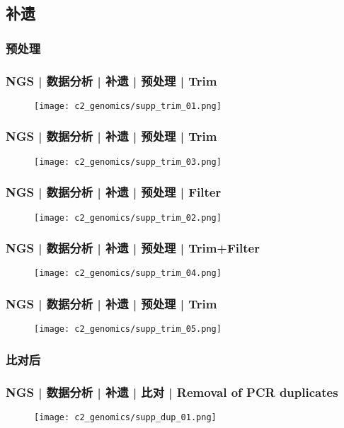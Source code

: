 \subsection{补遗}
\subsubsection{预处理}
\begin{frame}
  \frametitle{NGS | 数据分析 | 补遗 | 预处理 | Trim}
  \begin{figure}
    \centering
    \texttt{[image: c2\_genomics/supp\_trim\_01.png]}
  \end{figure}
\end{frame}

\begin{frame}
  \frametitle{NGS | 数据分析 | 补遗 | 预处理 | Trim}
  \begin{figure}
    \centering
    \texttt{[image: c2\_genomics/supp\_trim\_03.png]}
  \end{figure}
\end{frame}

\begin{frame}
  \frametitle{NGS | 数据分析 | 补遗 | 预处理 | Filter}
  \begin{figure}
    \centering
    \texttt{[image: c2\_genomics/supp\_trim\_02.png]}
  \end{figure}
\end{frame}

\begin{frame}
  \frametitle{NGS | 数据分析 | 补遗 | 预处理 | Trim+Filter}
  \begin{figure}
    \centering
    \texttt{[image: c2\_genomics/supp\_trim\_04.png]}
  \end{figure}
\end{frame}

\begin{frame}
  \frametitle{NGS | 数据分析 | 补遗 | 预处理 | Trim}
  \begin{figure}
    \centering
    \texttt{[image: c2\_genomics/supp\_trim\_05.png]}
  \end{figure}
\end{frame}

\subsubsection{比对后}
\begin{frame}
  \frametitle{NGS | 数据分析 | 补遗 | 比对 | Removal of PCR duplicates}
  \begin{figure}
    \centering
    \texttt{[image: c2\_genomics/supp\_dup\_01.png]}
  \end{figure}
\end{frame}

